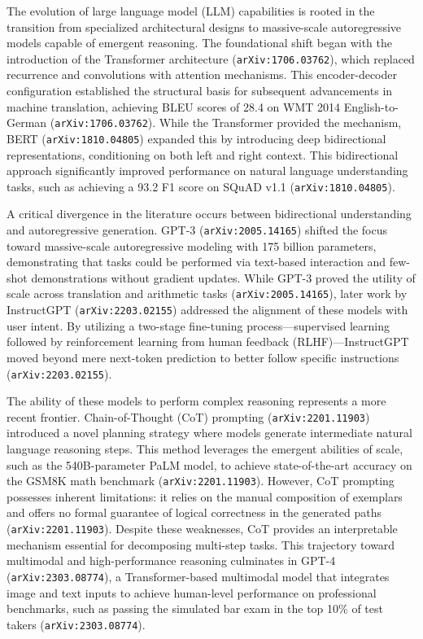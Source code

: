\documentclass[11pt]{article}
\begin{document}
The evolution of large language model (LLM) capabilities is rooted in the transition from specialized architectural designs to massive-scale autoregressive models capable of emergent reasoning. The foundational shift began with the introduction of the Transformer architecture (\texttt{arXiv:1706.03762}), which replaced recurrence and convolutions with attention mechanisms. This encoder-decoder configuration established the structural basis for subsequent advancements in machine translation, achieving BLEU scores of 28.4 on WMT 2014 English-to-German (\texttt{arXiv:1706.03762}). While the Transformer provided the mechanism, BERT (\texttt{arXiv:1810.04805}) expanded this by introducing deep bidirectional representations, conditioning on both left and right context. This bidirectional approach significantly improved performance on natural language understanding tasks, such as achieving a 93.2 F1 score on SQuAD v1.1 (\texttt{arXiv:1810.04805}).

A critical divergence in the literature occurs between bidirectional understanding and autoregressive generation. GPT-3 (\texttt{arXiv:2005.14165}) shifted the focus toward massive-scale autoregressive modeling with 175 billion parameters, demonstrating that tasks could be performed via text-based interaction and few-shot demonstrations without gradient updates. While GPT-3 proved the utility of scale across translation and arithmetic tasks (\texttt{arXiv:2005.14165}), later work by InstructGPT (\texttt{arXiv:2203.02155}) addressed the alignment of these models with user intent. By utilizing a two-stage fine-tuning process—supervised learning followed by reinforcement learning from human feedback (RLHF)—InstructGPT moved beyond mere next-token prediction to better follow specific instructions (\texttt{arXiv:2203.02155}).

The ability of these models to perform complex reasoning represents a more recent frontier. Chain-of-Thought (CoT) prompting (\texttt{arXiv:2201.11903}) introduced a novel planning strategy where models generate intermediate natural language reasoning steps. This method leverages the emergent abilities of scale, such as the 540B-parameter PaLM model, to achieve state-of-the-art accuracy on the GSM8K math benchmark (\texttt{arXiv:2201.11903}). However, CoT prompting possesses inherent limitations: it relies on the manual composition of exemplars and offers no formal guarantee of logical correctness in the generated paths (\texttt{arXiv:2201.11903}). Despite these weaknesses, CoT provides an interpretable mechanism essential for decomposing multi-step tasks. This trajectory toward multimodal and high-performance reasoning culminates in GPT-4 (\texttt{arXiv:2303.08774}), a Transformer-based multimodal model that integrates image and text inputs to achieve human-level performance on professional benchmarks, such as passing the simulated bar exam in the top 10\% of test takers (\texttt{arXiv:2303.08774}).
\end{document}

